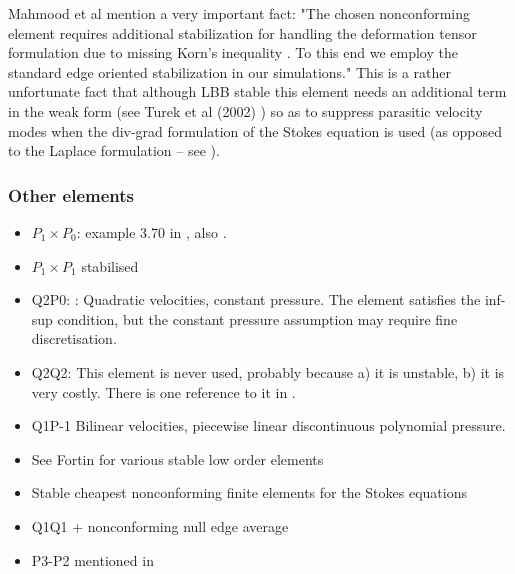 Mahmood et al \cite{maky17} mention a very important fact: "The chosen nonconforming element requires
additional stabilization for handling the deformation tensor formulation due to missing Korn’s inequality 
\cite{horg95,knob00}.
To this end we employ the standard edge oriented stabilization \cite{tuos02,tuou07} in our simulations."
This is a rather unfortunate fact that although LBB stable this element needs an additional 
term in the weak form (see Turek et al (2002) \cite{tuos02}) 
so as to suppress parasitic velocity modes when the div-grad formulation 
of the Stokes equation is used (as opposed to the Laplace formulation -- see \cite[Section 6.5.2]{dohu03}).













\subsubsection{Other elements}

\begin{itemize}
\item $P_1\times P_0$: example 3.70 in \cite{john16}, also \cite{john98}. 
\item $P_1\times P_1$ stabilised \cite{nosi98,tasu00}
\item Q2P0: : 
Quadratic velocities, constant pressure. The element satisfies the inf-sup condition, but the constant pressure assumption may require fine discretisation.

\item Q2Q2: This element is never used, probably because a) it is unstable, b) it is very costly. 
There is one reference to it in \cite{hufb86}.
\item Q1P-1 Bilinear velocities,  piecewise linear discontinuous polynomial pressure.
\item See Fortin \cite{fort81} for various stable low order elements
\item Stable cheapest nonconforming finite elements for the Stokes equations \cite{kiys16}
\item Q1Q1 + nonconforming null edge average \cite{fros07}
\item P3-P2 mentioned in \cite{sten90}   

\end{itemize}

